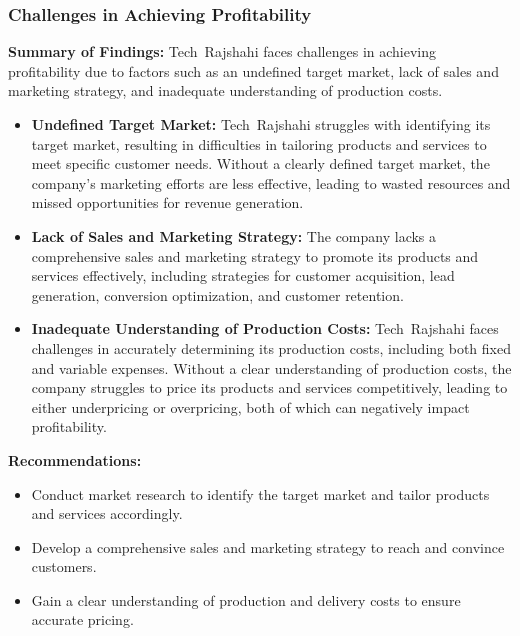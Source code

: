 \documentclass[12pt,a4paper]{article}
\begin{document}
\subsubsection{Challenges in Achieving Profitability}
\textbf{Summary of Findings:} Tech Rajshahi faces challenges in achieving profitability due to factors such as an undefined target market, lack of sales and marketing strategy, and inadequate understanding of production costs.
\begin{itemize}
    \item \textbf{Undefined Target Market:} Tech Rajshahi struggles with identifying its target market, resulting in difficulties in tailoring products and services to meet specific customer needs.  Without a clearly defined target market, the company’s marketing efforts are less effective, leading to wasted resources and missed opportunities for revenue generation.
    \item \textbf{Lack of Sales and Marketing Strategy:} The company lacks a comprehensive sales and marketing strategy to promote its products and services effectively, including strategies for customer acquisition, lead generation, conversion optimization, and customer retention.
    \item \textbf{Inadequate Understanding of Production Costs:} Tech Rajshahi faces challenges in accurately determining its production costs, including both fixed and variable expenses.  Without a clear understanding of production costs, the company struggles to price its products and services competitively, leading to either underpricing or overpricing, both of which can negatively impact profitability.
\end{itemize}
\textbf{Recommendations:}
\begin{itemize}
    \item Conduct market research to identify the target market and tailor products and services accordingly.
    \item Develop a comprehensive sales and marketing strategy to reach and convince customers.
    \item Gain a clear understanding of production and delivery costs to ensure accurate pricing.
\end{itemize}
\end{document}
